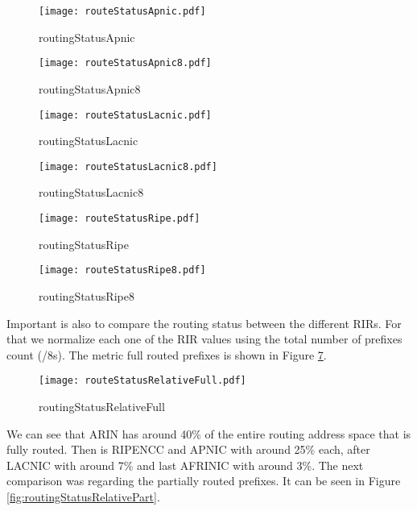 \documentclass[11pt,a4paper]{scrreprt}
\begin{document}
\begin{figure}[ht!]
\centering
\texttt{[image: routeStatusApnic.pdf]}
\caption{routingStatusApnic}
\label{fig:routingStatusApnic}
\end{figure}

\begin{figure}[ht!]
\centering
\texttt{[image: routeStatusApnic8.pdf]}
\caption{routingStatusApnic8}
\label{fig:routingStatusApnic8}
\end{figure}

\begin{figure}[ht!]
\centering
\texttt{[image: routeStatusLacnic.pdf]}
\caption{routingStatusLacnic}
\label{fig:routingStatusLacnic}
\end{figure}

\begin{figure}[ht!]
\centering
\texttt{[image: routeStatusLacnic8.pdf]}
\caption{routingStatusLacnic8}
\label{fig:routingStatusLacnic8}
\end{figure}

\begin{figure}[ht!]
\centering
\texttt{[image: routeStatusRipe.pdf]}
\caption{routingStatusRipe}
\label{fig:routingStatusRipe}
\end{figure}

\begin{figure}[ht!]
\centering
\texttt{[image: routeStatusRipe8.pdf]}
\caption{routingStatusRipe8}
\label{fig:routingStatusRipe8}
\end{figure}

Important is also to compare the routing status between the different RIRs. For that we normalize each one of the RIR values using the total number of prefixes count (/8s). The metric full routed prefixes is shown in Figure \ref{fig:routingStatusRelativeFull}.  

\begin{figure}[ht!]
\centering
\texttt{[image: routeStatusRelativeFull.pdf]}
\caption{routingStatusRelativeFull}
\label{fig:routingStatusRelativeFull}
\end{figure}

We can see that ARIN has around 40\% of the entire routing address space that is fully routed. Then is RIPENCC and APNIC with around 25\% each, after LACNIC with around 7\% and last AFRINIC  with around 3\%.  
The next comparison was regarding the partially routed prefixes. It can be seen in Figure \ref{fig:routingStatusRelativePart}. 
\end{document}
